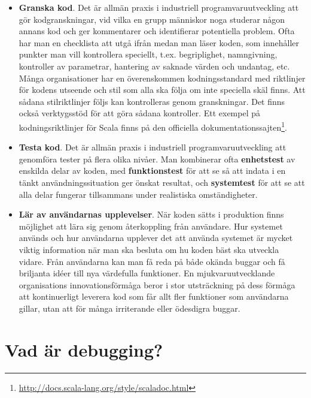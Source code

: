 \begin{itemize}
\item \textbf{Granska kod}. Det är allmän praxis i industriell programvaruutveckling att gör kodgranskningar, vid vilka en grupp människor noga studerar någon annans kod och ger kommentarer och identifierar potentiella problem. Ofta har man en checklista att utgå ifrån medan man läser koden, som innehåller punkter man vill kontrollera speciellt, t.ex. begriplighet, namngivning, kontroller av parametrar, hantering av saknade värden och undantag, etc. Många organisationer har en överenskommen kodningsstandard med riktlinjer för kodens utseende och stil som alla ska följa om inte speciella skäl finns. Att sådana stilriktlinjer följs kan kontrolleras genom granskningar. Det finns också verktygsstöd för att göra sådana kontroller. Ett exempel på kodningsriktlinjer för Scala finns på den officiella dokumentationssajten\footnote{\url{http://docs.scala-lang.org/style/scaladoc.html}}. 


\item \textbf{Testa kod}. Det är allmän praxis i industriell programvaruutveckling att genomföra tester på flera olika nivåer. Man kombinerar ofta \textbf{enhetstest}  av enskilda delar av koden, med \textbf{funktionstest}  för att se så att indata i en tänkt användningssituation ger önskat resultat, och \textbf{systemtest}  för att se att alla delar fungerar tillsammans under realistiska omständigheter. 

\item \textbf{Lär av användarnas upplevelser}. När koden sätts i produktion finns möjlighet att lära sig genom återkoppling från användare. Hur systemet används och hur användarna upplever det att använda systemet är mycket viktig information när man ska besluta om hu koden bäst ska utveckla vidare. Från användarna kan man få reda på både okända buggar och få briljanta idéer till nya värdefulla funktioner. En mjukvaruutvecklande organisations innovationsförmåga beror i stor utsträckning på dess förmåga att kontinuerligt leverera kod som får allt fler funktioner som användarna gillar, utan att för många irriterande eller ödesdigra buggar.

\end{itemize}



\section{Vad är debugging?}

